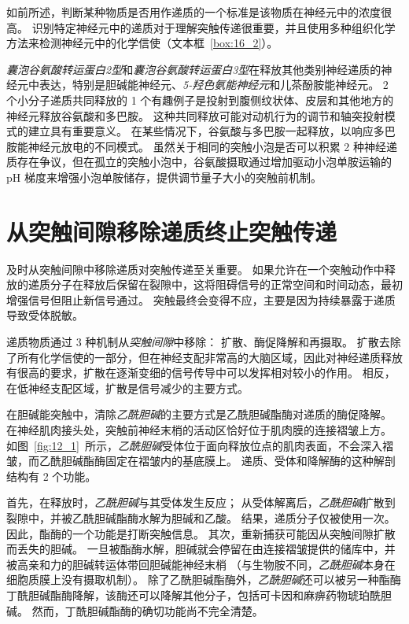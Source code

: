 如前所述，判断某种物质是否用作递质的一个标准是该物质在神经元中的浓度很高。
识别特定神经元中的递质对于理解突触传递很重要，并且使用多种组织化学方法来检测神经元中的化学信使（文本框~\ref{box:16_2}）。


\textit{囊泡谷氨酸转运蛋白2型}和\textit{囊泡谷氨酸转运蛋白3型}在释放其他类别神经递质的神经元中表达，特别是胆碱能神经元、\textit{5-羟色氨能神经元}和儿茶酚胺能神经元。
2 个小分子递质共同释放的 1 个有趣例子是投射到腹侧纹状体、皮层和其他地方的神经元释放谷氨酸和多巴胺。
这种共同释放可能对动机行为的调节和轴突投射模式的建立具有重要意义。
在某些情况下，谷氨酸与多巴胺一起释放，以响应多巴胺能神经元放电的不同模式。
虽然关于相同的突触小泡是否可以积累 2 种神经递质存在争议，但在孤立的突触小泡中，谷氨酸摄取通过增加驱动小泡单胺运输的 pH 梯度来增强小泡单胺储存，提供调节量子大小的突触前机制。



\section{从突触间隙移除递质终止突触传递}

及时从突触间隙中移除递质对突触传递至关重要。
如果允许在一个突触动作中释放的递质分子在释放后保留在裂隙中，这将阻碍信号的正常空间和时间动态，最初增强信号但阻止新信号通过。
突触最终会变得不应，主要是因为持续暴露于递质导致受体脱敏。


递质物质通过 3 种机制从\textit{突触间隙}中移除：
扩散、酶促降解和再摄取。
扩散去除了所有化学信使的一部分，但在神经支配非常高的大脑区域，因此对神经递质释放有很高的要求，扩散在逐渐变细的信号传导中可以发挥相对较小的作用。
相反，在低神经支配区域，扩散是信号减少的主要方式。


在胆碱能突触中，清除\textit{乙酰胆碱}的主要方式是乙酰胆碱酯酶对递质的酶促降解。
在神经肌肉接头处，突触前神经末梢的活动区恰好位于肌肉膜的连接褶皱上方。
如图~\ref{fig:12_1}~所示，\textit{乙酰胆碱}受体位于面向释放位点的肌肉表面，不会深入褶皱，而乙酰胆碱酯酶固定在褶皱内的基底膜上。
递质、受体和降解酶的这种解剖结构有 2 个功能。


首先，在释放时，\textit{乙酰胆碱}与其受体发生反应；
从受体解离后，\textit{乙酰胆碱}扩散到裂隙中，并被乙酰胆碱酯酶水解为胆碱和乙酸。
结果，递质分子仅被使用一次。
因此，酯酶的一个功能是打断突触信息。
其次，重新捕获可能因从突触间隙扩散而丢失的胆碱。
一旦被酯酶水解，胆碱就会停留在由连接褶皱提供的储库中，并被高亲和力的胆碱转运体带回胆碱能神经末梢
（与生物胺不同，\textit{乙酰胆碱}本身在细胞质膜上没有摄取机制）。
除了乙酰胆碱酯酶外，\textit{乙酰胆碱}还可以被另一种酯酶丁酰胆碱酯酶降解，该酶还可以降解其他分子，包括可卡因和麻痹药物琥珀酰胆碱。
然而，丁酰胆碱酯酶的确切功能尚不完全清楚。


